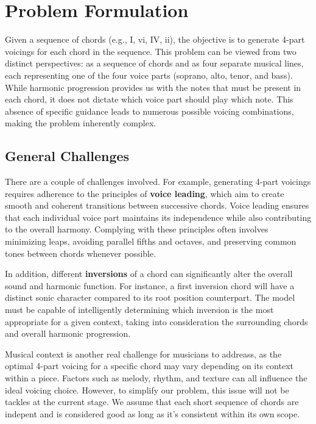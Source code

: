 \documentclass[12pt, letterpaper]{article}
\begin{document}
\section{Problem Formulation}

Given a sequence of chords (e.g., I, vi, IV, ii), the objective is to generate 4-part voicings for each chord in the sequence. This problem can be viewed from two distinct perspectives: as a sequence of chords and as four separate musical lines, each representing one of the four voice parts (soprano, alto, tenor, and bass). While harmonic progression provides us with the notes that must be present in each chord, it does not dictate which voice part should play which note. This absence of specific guidance leads to numerous possible voicing combinations, making the problem inherently complex.

\subsection{General Challenges}

There are a couple of challenges involved. For example, generating 4-part voicings requires adherence to the principles of \textbf{voice leading}, which aim to create smooth and coherent transitions between successive chords. Voice leading ensures that each individual voice part maintains its independence while also contributing to the overall harmony. Complying with these principles often involves minimizing leaps, avoiding parallel fifths and octaves, and preserving common tones between chords whenever possible.

In addition, different \textbf{inversions} of a chord can significantly alter the overall sound and harmonic function. For instance, a first inversion chord will have a distinct sonic character compared to its root position counterpart. The model must be capable of intelligently determining which inversion is the most appropriate for a given context, taking into consideration the surrounding chords and overall harmonic progression.

Musical context is another real challenge for musicians to addreass, as the optimal 4-part voicing for a specific chord may vary depending on its context within a piece. Factors such as melody, rhythm, and texture can all influence the ideal voicing choice. However, to simplify our problem, this issue will not be tackles at the current stage. We assume that each short sequence of chords are indepent and is considered good as long as it's consistent within its own scope.
\end{document}
